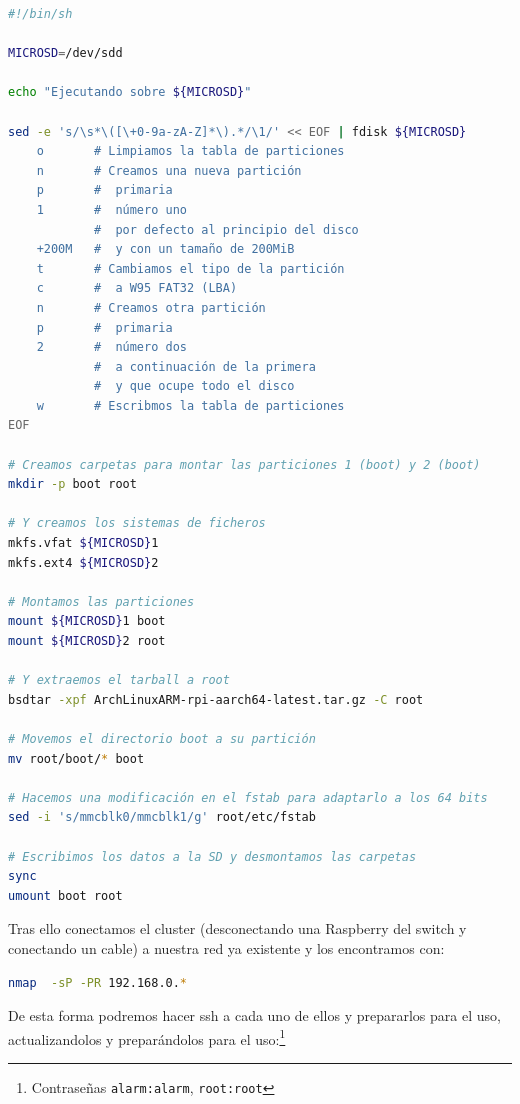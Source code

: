 \begin{lstlisting}[language=bash]
#!/bin/sh

MICROSD=/dev/sdd

echo "Ejecutando sobre ${MICROSD}"

sed -e 's/\s*\([\+0-9a-zA-Z]*\).*/\1/' << EOF | fdisk ${MICROSD}
    o       # Limpiamos la tabla de particiones
    n       # Creamos una nueva partición
    p       #  primaria
    1       #  número uno
            #  por defecto al principio del disco
    +200M   #  y con un tamaño de 200MiB
    t       # Cambiamos el tipo de la partición
    c       #  a W95 FAT32 (LBA)
    n       # Creamos otra partición
    p       #  primaria
    2       #  número dos
            #  a continuación de la primera
            #  y que ocupe todo el disco
    w       # Escribmos la tabla de particiones
EOF

# Creamos carpetas para montar las particiones 1 (boot) y 2 (boot)
mkdir -p boot root

# Y creamos los sistemas de ficheros
mkfs.vfat ${MICROSD}1
mkfs.ext4 ${MICROSD}2

# Montamos las particiones
mount ${MICROSD}1 boot
mount ${MICROSD}2 root

# Y extraemos el tarball a root
bsdtar -xpf ArchLinuxARM-rpi-aarch64-latest.tar.gz -C root

# Movemos el directorio boot a su partición
mv root/boot/* boot

# Hacemos una modificación en el fstab para adaptarlo a los 64 bits
sed -i 's/mmcblk0/mmcblk1/g' root/etc/fstab

# Escribimos los datos a la SD y desmontamos las carpetas
sync
umount boot root
\end{lstlisting}

Tras ello conectamos el cluster (desconectando una Raspberry del switch y conectando un cable) a nuestra red ya existente y los encontramos con:

\begin{lstlisting}[language=bash]
nmap  -sP -PR 192.168.0.*    
\end{lstlisting}

De esta forma podremos hacer ssh a cada uno de ellos y prepararlos para el uso, actualizandolos y preparándolos para el uso:\footnote{Contraseñas \texttt{alarm:alarm}, \texttt{root:root}}

